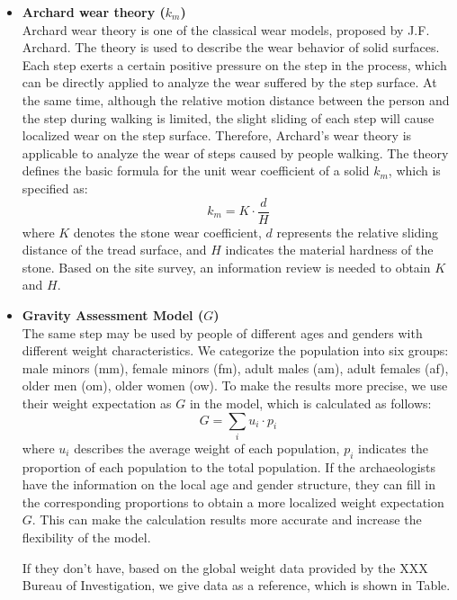 \documentclass[12pt]{article}  %
\numberwithin{equation}{section} %
\begin{document}
\begin{itemize}
	\setlength{\parsep}{0ex} %
	\setlength{\topsep}{2ex} %
	\setlength{\itemsep}{1ex} %
	\item \textbf{Archard wear theory ($k_m$)} \\
\quad Archard wear theory is one of the classical wear models, proposed by J.F. Archard. The theory is used to describe the wear behavior of solid surfaces. Each step exerts a certain positive pressure on the step in the process, which can be directly applied to analyze the wear suffered by the step surface. At the same time, although the relative motion distance between the person and the step during walking is limited, the slight sliding of each step will cause localized wear on the step surface. Therefore, Archard's wear theory is applicable to analyze the wear of steps caused by people walking. The theory defines the basic formula for the unit wear coefficient of a solid $k_m$, which is specified as:
\begin{equation}
    k_m = K\cdot{\frac{d}{H}}
\end{equation}
where $K$ denotes the stone wear coefficient, $d$ represents the relative sliding distance of the tread surface, and $H$ indicates the material hardness of the stone. Based on the site survey, an information review is needed to obtain $K$ and $H$.

   \item \textbf{Gravity Assessment Model ($G$)}\\
   \quad The same step may be used by people of different ages and genders with different weight characteristics. We categorize the population into six groups: male minors (mm), female minors (fm), adult males (am), adult females (af), older men (om), older women (ow). To make the results more precise, we use their weight expectation as $G$ in the model, which is calculated as follows:
    \begin{equation}
        G=\sum_{i}u_i\cdot{p_i}
    \end{equation}
    \quad where $u_i$ describes the average weight of each population, $p_i$ indicates the proportion of each population to the total population. If the archaeologists have the information on the local age and gender structure, they can fill in the corresponding proportions to obtain a more localized weight expectation $G$. This can make the calculation results more accurate and increase the flexibility of the model.
    
    \quad If they don't have, based on the global weight data provided by the XXX Bureau of Investigation, we give data as a reference, which is shown in Table.
\end{itemize}
\end{document}
